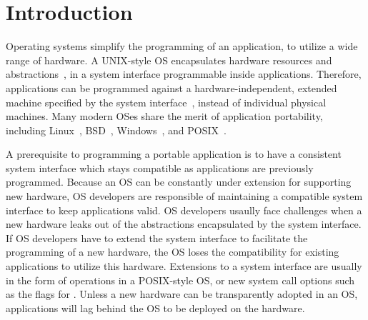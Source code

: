 \chapter{Introduction}
\label{chap:intro}


Operating systems simplify the programming of an application, to utilize a wide range of hardware.
A UNIX-style OS
encapsulates hardware resources and abstractions~\cite{ritchie74unix}, in a system interface programmable inside applications.
Therefore, applications can be programmed against a hardware-independent, extended machine specified by the system interface~\cite{dhamdhere2007os-textbook},
instead of individual physical machines.
Many modern OSes share the merit of application portability,
including Linux~\cite{linux-standard-base}, BSD~\cite{quarterman85bsd}, Windows~\cite{win-api},
and POSIX~\cite{ieee-posix}.



A prerequisite to programming a portable application
is to have a consistent system interface which stays compatible as applications are previously programmed.
Because an OS can be constantly under extension for supporting new hardware,
OS developers are responsible of maintaining a compatible system interface to keep applications valid.
OS developers usaully face challenges
when a new hardware leaks out of the abstractions encapsulated by the system interface.
If OS developers have to extend the system interface
to facilitate the programming of a new hardware, 
the OS loses the compatibility for existing applications 
to utilize this hardware.
Extensions to a system interface are usually in the form of  operations in a POSIX-style OS,
or new system call options such as the  flags for .
Unless a new hardware can be transparently adopted in an OS,
applications will lag behind the OS to be deployed on the hardware.



